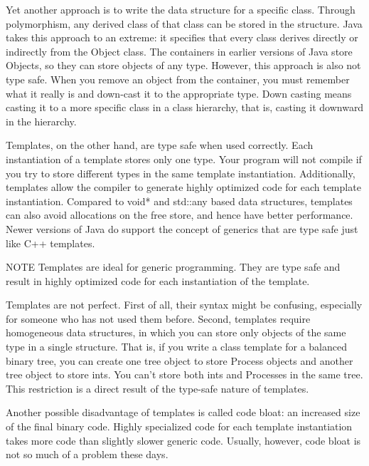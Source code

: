 Yet another approach is to write the data structure for a specific class. Through polymorphism, any derived class of that class can be stored in the structure. Java takes this approach to an extreme: it specifies that every class derives directly or indirectly from the Object class. The containers in earlier versions of Java store Objects, so they can store objects of any type. However, this approach is also not type safe. When you remove an object from the container, you must remember what it really is and down-cast it to the appropriate type. Down casting means casting it to a more specific class in a class hierarchy, that is, casting it downward in the hierarchy.

Templates, on the other hand, are type safe when used correctly. Each instantiation of a template stores only one type. Your program will not compile if you try to store different types in the same template instantiation. Additionally, templates allow the compiler to generate highly optimized code for each template instantiation. Compared to void* and std::any based data structures, templates can also avoid allocations on the free store, and hence have better performance. Newer versions of Java do support the concept of generics that are type safe just like C++ templates.

\begin{myNotic}{NOTE}
Templates are ideal for generic programming. They are type safe and result in highly optimized code for each instantiation of the template.
\end{myNotic}


Templates are not perfect. First of all, their syntax might be confusing, especially for someone who has not used them before. Second, templates require homogeneous data structures, in which you can store only objects of the same type in a single structure. That is, if you write a class template for a balanced binary tree, you can create one tree object to store Process objects and another tree object to store ints. You can’t store both ints and Processes in the same tree. This restriction is a direct result of the type-safe nature of templates.

Another possible disadvantage of templates is called code bloat: an increased size of the final binary code. Highly specialized code for each template instantiation takes more code than slightly slower generic code. Usually, however, code bloat is not so much of a problem these days.

